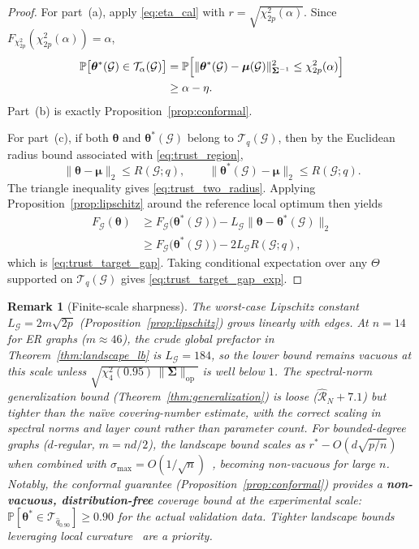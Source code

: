 \documentclass[aps,prx,reprint,superscriptaddress,longbibliography]{revtex4-2}
\newcommand{\calG}{\mathcal{G}}
\newcommand{\calT}{\mathcal{T}}
\newcommand{\calR}{\mathcal{R}}
\newcommand{\bbP}{\mathbb{P}}
\newtheorem{remark}{Remark}
\begin{document}
\begin{proof}
For part~(a), apply \cref{eq:eta_cal} with
$r = \sqrt{\chi^2_{2p}(\alpha)}$. Since
$F_{\chi^2_{2p}}(\chi^2_{2p}(\alpha)) = \alpha$,
\begin{align*}
    \bbP\bigl[\bm\theta^*(\calG) \in \calT_\alpha(\calG)\bigr]
    &= \bbP\Bigl[\|\bm\theta^*(\calG)-\bm\mu(\calG)\|_{\bm\Sigma^{-1}}^2
    \le \chi^2_{2p}(\alpha)\Bigr] \\
    &\ge \alpha - \eta.
\end{align*}
Part~(b) is exactly Proposition~\ref{prop:conformal}.

For part~(c), if both $\bm\theta$ and $\bm\theta^*(\calG)$ belong to
$\calT_q(\calG)$, then by the Euclidean radius bound associated with
\cref{eq:trust_region},
\begin{equation*}
    \|\bm\theta-\bm\mu\|_2 \le R(\calG;q),
    \qquad
    \|\bm\theta^*(\calG)-\bm\mu\|_2 \le R(\calG;q).
\end{equation*}
The triangle inequality gives \cref{eq:trust_two_radius}. Applying
Proposition~\ref{prop:lipschitz} around the reference local optimum then
yields
\begin{equation*}
    \begin{aligned}
    F_\calG(\bm\theta)
    &\ge F_\calG\bigl(\bm\theta^*(\calG)\bigr)
    - L_\calG\|\bm\theta-\bm\theta^*(\calG)\|_2 \\
    &\ge F_\calG\bigl(\bm\theta^*(\calG)\bigr)
    - 2L_\calG R(\calG;q),
    \end{aligned}
\end{equation*}
which is \cref{eq:trust_target_gap}. Taking conditional expectation over
any $\Theta$ supported on $\calT_q(\calG)$ gives
\cref{eq:trust_target_gap_exp}.
\end{proof}

\begin{remark}[Finite-scale sharpness]
\label{rem:bound_tightness}
The worst-case Lipschitz constant
$L_\calG = 2m\sqrt{2p}$ (Proposition~\ref{prop:lipschitz})
grows linearly with edges.
At $n{=}14$ for ER graphs ($m \approx 46$),
the crude global prefactor in Theorem~\ref{thm:landscape_lb} is
$L_\calG = 184$, so the lower bound remains vacuous at this scale
unless $\sqrt{\chi^2_4(0.95)\,\|\bm\Sigma\|_{\mathrm{op}}}$ is well
below $1$.
The spectral-norm generalization bound
(Theorem~\ref{thm:generalization}) is loose
($\hat{\calR}_N + 7.1$) but tighter than the na\"ive
covering-number estimate, with the correct scaling in
spectral norms and layer count rather than parameter count.
For bounded-degree graphs ($d$-regular, $m = nd/2$), the
landscape bound scales as $r^* - O(d\sqrt{p/n})$ when
combined with $\sigma_{\max} = O(1/\sqrt{n})$~\cite{brandao2018},
becoming non-vacuous for large $n$.
Notably, the conformal guarantee
(Proposition~\ref{prop:conformal}) provides a
\textbf{non-vacuous, distribution-free} coverage bound at
the experimental scale:
$\bbP[\bm\theta^* \in \calT_{\hat{q}_{0.90}}] \ge 0.90$
for the actual validation data.
Tighter landscape bounds leveraging local
curvature~\cite{larocca2023,mcclean2018} are a priority.
\end{remark}
\end{document}
